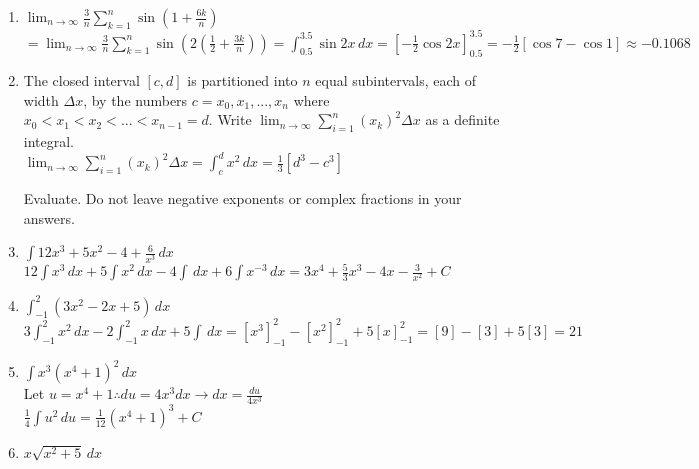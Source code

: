 \documentclass[10pt, letterpaper]{report}
\begin{document}
\begin{enumerate}
  \item{$\lim_{n\to\infty}\frac{3}{n}\sum_{k=1}^{n}{\sin{(1+\frac{6k}{n})}}$} \\

    $=\lim_{n\to\infty}\frac{3}{n}\sum_{k=1}^{n}{\sin{(2(\frac{1}{2}+\frac{3k}{n}))}}=
    \int_{0.5}^{3.5}{\sin{2x}}\,dx=
    [-\frac{1}{2}\cos{2x}]_{0.5}^{3.5}=
    -\frac{1}{2}[\cos{7}-\cos{1}]\approx-0.1068$ \\

\hline
  \item{The closed interval $[c,d]$ is partitioned into $n$ equal subintervals, each of width $\Delta x$, by the numbers $c=x_{0}, x_{1}, ... ,x_{n}$ where $x_{0}<x_{1}<x_{2}<...<x_{n-1}=d$. Write $\lim_{n\to\infty}\sum_{i=1}^{n}{(x_{k})^{2}}\Delta x$ as a definite integral.} \\

    $\lim_{n\to\infty}\sum_{i=1}^{n}(x_{k})^{2}\Delta x=\int_{c}^{d}{x^{2}}\,dx=
    \frac{1}{3}[d^{3}-c^{3}]$ \\
\pagebreak
  \par Evaluate. Do not leave negative exponents or complex fractions in your answers. \\
  \item{$\int{12x^{3}+5x^{2}-4+\frac{6}{x^{3}}}\,dx$} \\

    $12\int{x^3}\,dx+5\int{x^2}\,dx-4\int\,dx+6\int{x^{-3}}\,dx=
    3x^4+\frac{5}{3}x^{3}-4x-\frac{3}{x^{2}}+C$ \\

  \item{$\int_{-1}^{2}{(3x^{2}-2x+5)}\,dx$} \\

    $3\int_{-1}^{2}{x^2}\,dx-2\int_{-1}^{2}{x}\,dx+5\int\,dx=
    [x^{3}]_{-1}^{2}-[x^{2}]_{-1}^{2}+5[x]_{-1}^{2}=
    [9]-[3]+5[3]=21$ \\

  \item{$\int{x^{3}(x^{4}+1)^{2}}\,dx$} \\

    Let $u=x^{4}+1\therefore du=4x^{3}dx\rightarrow dx=\frac{du}{4x^{3}}$ \\

    $\frac{1}{4}\int{u^{2}}\,du=
    \frac{1}{12}(x^{4}+1)^{3}+C$ \\

  \item{$x\sqrt{x^{2}+5}\,dx$} \\


\end{enumerate}
\end{document}
